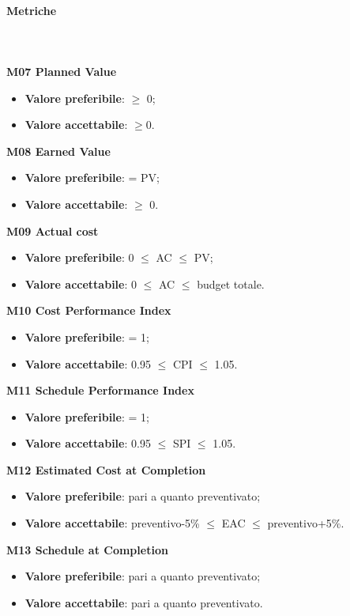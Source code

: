 			\paragraph{Metriche} \mbox{} \\ \\
			\textbf{M07 Planned Value}
			\begin{itemize}
				\item \textbf{Valore preferibile}: $\ge$ 0;
				\item \textbf{Valore accettabile}: $\ge$0.
			\end{itemize}
			\textbf{M08 Earned Value}
			\begin{itemize}
				\item \textbf{Valore preferibile}: = PV;
				\item \textbf{Valore accettabile}: $\ge$ 0.
			\end{itemize}
			\textbf{M09 Actual cost}
			\begin{itemize}
				\item \textbf{Valore preferibile}: 0 $\le$ AC $\le$ PV;
				\item \textbf{Valore accettabile}: 0 $\le$ AC $\le$ budget totale.
			\end{itemize}
			\textbf{M10 Cost Performance Index}
			\begin{itemize}
				\item \textbf{Valore preferibile}: = 1;
				\item \textbf{Valore accettabile}: 0.95 $\le$ CPI $\le$ 1.05.
			\end{itemize}
			\textbf{M11 Schedule Performance Index}
			\begin{itemize}
				\item \textbf{Valore preferibile}: = 1;
				\item \textbf{Valore accettabile}: 0.95 $\le$ SPI $\le$ 1.05.
			\end{itemize}
			\textbf{M12 Estimated Cost at Completion}
			\begin{itemize}
				\item \textbf{Valore preferibile}: pari a quanto preventivato;
				\item \textbf{Valore accettabile}: preventivo-5\% $\le$ EAC $\le$ preventivo+5\%.
			\end{itemize}
			\textbf{M13 Schedule at Completion}
			\begin{itemize}
				\item \textbf{Valore preferibile}: pari a quanto preventivato;
				\item \textbf{Valore accettabile}: pari a quanto preventivato.
			\end{itemize}

